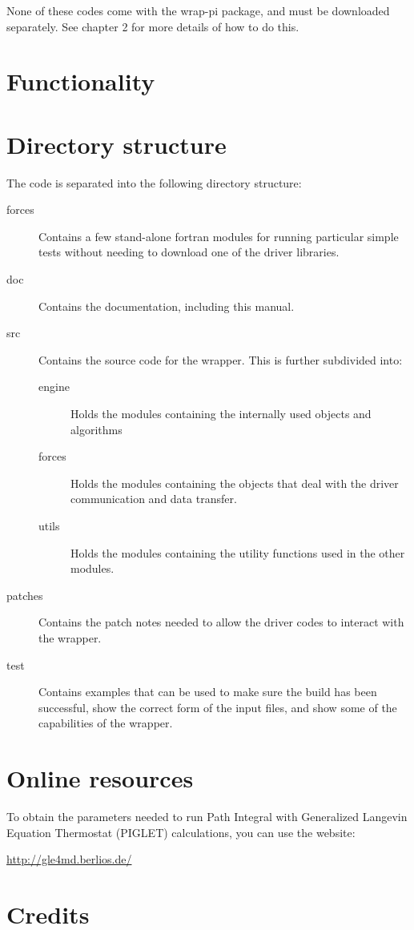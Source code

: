 \documentclass[12pt,fleqn]{report}
\begin{document}
None of these codes come with the wrap-pi package, and must be downloaded 
separately. See chapter 2 for more details of how to do this. 
\section{Functionality}
\section{Directory structure}
The code is separated into the following directory structure:
\begin{description}
\item[forces] Contains a few stand-alone fortran modules for running particular simple tests without needing to download one of the driver libraries.
\item[doc] Contains the documentation, including this manual.
\item[src] Contains the source code for the wrapper. This is further 
subdivided into:
\begin{description}
\item[engine] Holds the modules containing the internally used objects and 
algorithms
\item[forces] Holds the modules containing the objects that deal with the 
driver communication and data transfer.
\item[utils] Holds the modules containing the utility functions used in the 
other modules.
\end{description}
\item[patches] Contains the patch notes needed to allow the driver codes to 
interact with the wrapper.
\item[test] Contains examples that can be used to make sure the build has been
successful, show the correct form of the input files, and show some of the 
capabilities of the wrapper.
\end{description}
\section{Online resources}
To obtain the parameters needed to run Path Integral with Generalized 
Langevin Equation Thermostat (PIGLET) calculations, you can use the website:

\begin{center}
\url{http://gle4md.berlios.de/}
\end{center}
\section{Credits}
\end{document}
